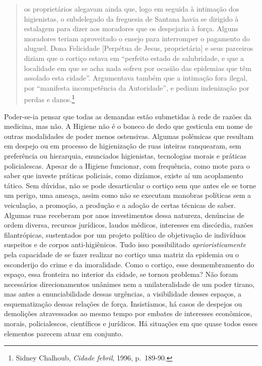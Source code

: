 \begin{quote}
os proprietários alegavam ainda que, logo em seguida à intimação dos
higienistas, o subdelegado da freguesia de Santana havia se dirigido à
estalagem para dizer aos moradores que os despejaria à força. Alguns
moradores teriam aproveitado o ensejo para interromper o pagamento do
aluguel. Dona Felicidade {[}Perpétua de Jesus, proprietária{]} e seus
parceiros diziam que o cortiço estava em ``perfeito estado de
salubridade, e que a localidade em que se acha nada sofreu por ocasião
das epidemias que têm assolado esta cidade''. Argumentava também que a
intimação fora ilegal, por ``manifesta incompetência da Autoridade'', e
pediam indenização por perdas e danos.\footnote{Sidney Chalhoub,
  \emph{Cidade febril}, 1996, p.~189-90.}
\end{quote}

Poder-se-ia pensar que todas as demandas estão submetidas à rede de
razões da medicina, mas não. A Higiene não é o boneco de dedo que
gesticula em nome de outras modalidades de poder menos ostensivas.
Algumas polêmicas que resultam em despejo ou em processo de higienização
de ruas inteiras ranquearam, sem preferência ou hierarquia, enunciados
higienistas, tecnologias morais e práticas policialescas. Apesar de a
Higiene funcionar, com frequência, como mote para o saber que investe
práticas policiais, como dizíamos, existe aí um acoplamento tático. Sem
dúvidas, não se pode desarticular o cortiço sem que antes ele se torne
um perigo, uma ameaça, assim como não se executam manobras políticas sem
a veiculação, a promoção, a produção e a adoção de certas técnicas de
saber. Algumas ruas receberam por anos investimentos dessa natureza,
denúncias de ordem diversa, recursos jurídicos, laudos médicos,
interesses em discórdia, razões filantrópicas, sustentados por um
projeto político de objetivação de indivíduos suspeitos e de corpos
anti-higiênicos. Tudo isso possibilitado \emph{aprioristicamente} pela
capacidade de se fazer realizar no cortiço uma matriz da epidemia ou o
esconderijo do crime e da imoralidade. Como o cortiço, esse
desmembramento do espaço, essa fronteira no interior da cidade, se
tornou problema? Não foram necessários direcionamentos unânimes nem a
unilateralidade de um poder tirano, mas antes a enunciabilidade dessas
urgências, a visibilidade desses espaços, a esquematização dessas
relações de força. Insistíamos, há casos de despejos ou demolições
atravessados ao mesmo tempo por embates de interesses econômicos,
morais, policialescos, científicos e jurídicos. Há situações em que
quase todos esses elementos parecem atuar em conjunto.

